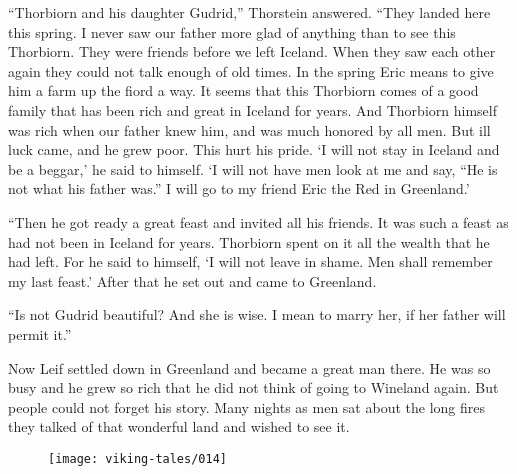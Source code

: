 ``Thorbiorn and his daughter Gudrid,'' Thorstein answered. ``They landed
here this spring. I never saw our father more glad of anything than to
see this Thorbiorn. They were friends before we left Iceland. When they
saw each other again they could not talk enough of old times. In the
spring Eric means to give him a farm up the fiord a way. It seems that
this Thorbiorn comes of a good family that has been rich and great in
Iceland for years. And Thorbiorn himself was rich when our father knew
him, and was much honored by all men. But ill luck came, and he grew
poor. This hurt his pride. `I will not stay in Iceland and be a beggar,'
he said to himself. `I will not have men look at me and say, ``He is not
what his father was.'' I will go to my friend Eric the Red in
Greenland.'

``Then he got ready a great feast and invited all his friends. It was
such a feast as had not been in Iceland for years. Thorbiorn spent on it
all the wealth that he had left. For he said to himself, `I will not
leave in shame. Men shall remember my last feast.' After that he set out
and came to Greenland.

``Is not Gudrid beautiful? And she is wise. I mean to marry her, if her
father will permit it.''

Now Leif settled down in Greenland and became a great man there. He was
so busy and he grew so rich that he did not think of going to Wineland
again. But people could not forget his story. Many nights as men sat
about the long fires they talked of that wonderful land and wished to
see it.

\begin{figure}[hb]
    \centering
    \vskip8pt
    \texttt{[image: viking-tales/014]}
\end{figure}
